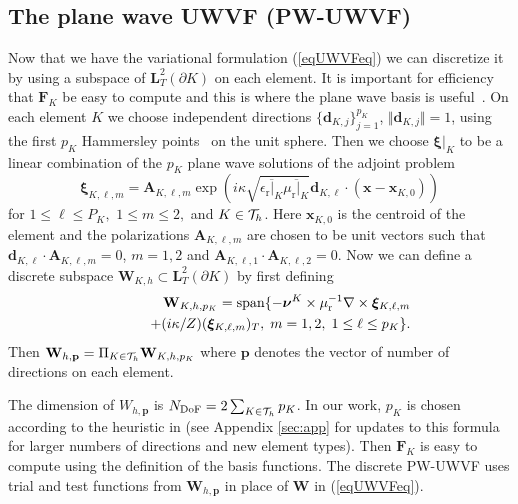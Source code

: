 \documentclass[a4paper,12pt]{article}
\newcommand{\bfF}{\mathbf{F}}
\newcommand{\bfL}{\mathbf{L}}
\newcommand{\bfW}{\mathbf{W}}
\newcommand{\bfA}{\mathbf{A}}
\newcommand{\bfnu}{\boldsymbol{\nu}}
\newcommand{\bfp}{\mathbf{p}}
\newcommand{\bfx}{\mathbf{x}}
\newcommand{\bfd}{\mathbf{d}}
\newcommand{\epsr}{\epsilon_{\mathrm{r}}}
\newcommand{\mur}{\mu_{\mathrm{r}}}
\newcommand{\bfxi}{\boldsymbol{\xi}}
\newcommand{\Ndof}{N_{\mathrm{DoF}}}
\begin{document}
\subsection{The plane wave  UWVF (PW-UWVF)}\label{Deriv}
Now that we have the variational formulation (\ref{eqUWVFeq})
we can discretize it by using a subspace of $\bfL^2_T(\partial K)$ on each element.  It is important for efficiency that $\bfF_K$ be easy to compute 
and this is where the plane wave basis is useful~\cite{cessenat_phd}.  On each element $K$ we 
choose independent directions $\{\bfd_{K,j}\}_{j=1}^{p_K}$, $\Vert\bfd_{K,j}\Vert=1$, using the first $p_K$ Hammersley points~\cite{hardin_16} on the unit sphere.  Then we 
choose $\bfxi|_K$ to be a linear combination of the $p_K$ plane wave solutions of the adjoint problem
 \[
 \bfxi_{K,\ell,m}=\bfA_{K,\ell,m} \exp\left(i\kappa\sqrt{\overline{\epsr|_K}\overline{\mur|_K}} \bfd_{K,\ell}\cdot (\bfx-\bfx_{K,0})\right)
 \]
 for $1\leq \ell\leq P_K,$ $1\leq m\leq 2,$ and $ K\in {\cal T}_h$.  Here $\bfx_{K,0}$ is the centroid of the element and the polarizations $\bfA_{K,\ell,m}$    are chosen to be unit vectors such that $\bfd_{K,\ell}\cdot \bfA_{K,\ell,m}=0$, $m=1,2$ and $\bfA_{K,\ell,1}\cdot\bfA_{K,\ell,2}=0$.   
Now we can define a discrete subspace $\bfW_{K,h}\subset\bfL_T^2(\partial K)$     
by first defining
\begin{eqnarray*}
&&\bfW_{K,h,p_K}={\rm span}\{-
\bfnu^K\times\mur^{-1}\nabla\times\bfxi_{K,\ell,m}\\&&\qquad+(i\kappa/Z)(\bfxi_{K,\ell,m})_T, \;m=1,2,\; 1\leq \ell\leq p_K\}.
\end{eqnarray*}
Then $\bfW_{h,\bfp}=\Pi_{K\in{\cal T}_h}\bfW_{K,h,p_K}$  where 
$\bfp$ denotes the vector of number of directions on each element. 


The dimension of $W_{h,\bfp}$ is $\Ndof=2\sum_{K\in{\cal T}_h}p_K$. In our work, $p_K$ is chosen according to the 
heuristic in \cite{Huttunen2007} (see Appendix \ref{sec:app} for updates to this formula for larger numbers of directions and new element types).  Then $\bfF_K$ is easy to compute using the definition
of the basis functions.  The discrete PW-UWVF uses trial and test functions from $\bfW_{h,\bfp}$ in place of $\bfW$
in (\ref{eqUWVFeq}).
\end{document}
